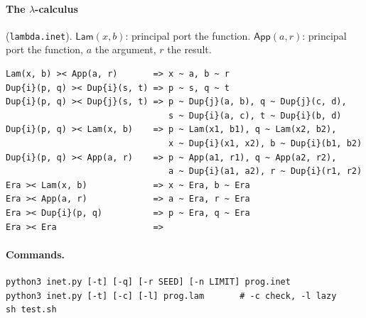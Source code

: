\documentclass[11pt,a4paper]{article}
\newcommand{\ag}[1]{\mathsf{#1}}
\newcommand{\Lam}{\ag{Lam}}
\newcommand{\App}{\ag{App}}
\theoremstyle{definition}
\theoremstyle{plain}
\begin{document}
\paragraph{The \texorpdfstring{$\lambda$}{lambda}-calculus} (\texttt{lambda.inet}).
$\Lam(x,b)$: principal port the function. $\App(a,r)$: principal port the
function, $a$ the argument, $r$ the result.
\begin{lstlisting}
Lam(x, b) >< App(a, r)       => x ~ a, b ~ r
Dup{i}(p, q) >< Dup{i}(s, t) => p ~ s, q ~ t
Dup{i}(p, q) >< Dup{j}(s, t) => p ~ Dup{j}(a, b), q ~ Dup{j}(c, d),
                                s ~ Dup{i}(a, c), t ~ Dup{i}(b, d)
Dup{i}(p, q) >< Lam(x, b)    => p ~ Lam(x1, b1), q ~ Lam(x2, b2),
                                x ~ Dup{i}(x1, x2), b ~ Dup{i}(b1, b2)
Dup{i}(p, q) >< App(a, r)    => p ~ App(a1, r1), q ~ App(a2, r2),
                                a ~ Dup{i}(a1, a2), r ~ Dup{i}(r1, r2)
Era >< Lam(x, b)             => x ~ Era, b ~ Era
Era >< App(a, r)             => a ~ Era, r ~ Era
Era >< Dup{i}(p, q)          => p ~ Era, q ~ Era
Era >< Era                   =>
\end{lstlisting}

\paragraph{Commands.}
\begin{lstlisting}[style=plain]
python3 inet.py [-t] [-q] [-r SEED] [-n LIMIT] prog.inet
python3 inet.py [-t] [-c] [-l] prog.lam       # -c check, -l lazy
sh test.sh
\end{lstlisting}
\end{document}
